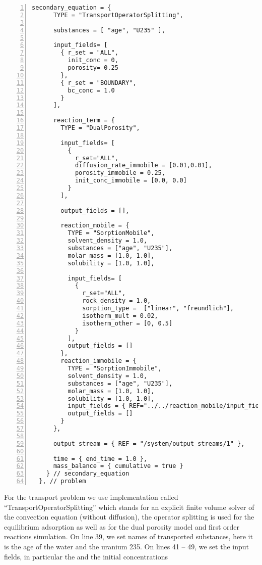 \documentclass[12pt,a4paper]{report}
\begin{document}
\begin{Verbatim}[numbers=left, firstnumber=last]
    secondary_equation = {
      TYPE = "TransportOperatorSplitting", 

      substances = [ "age", "U235" ],
      
      input_fields= [
        { r_set = "ALL",
          init_conc = 0,
          porosity= 0.25
        },
        { r_set = "BOUNDARY",
          bc_conc = 1.0
        }
      ],
      
      reaction_term = {
        TYPE = "DualPorosity",
        
        input_fields= [
          {
            r_set="ALL",
            diffusion_rate_immobile = [0.01,0.01],
            porosity_immobile = 0.25,
            init_conc_immobile = [0.0, 0.0]
          }
        ],
        
        output_fields = [],
        
        reaction_mobile = {
          TYPE = "SorptionMobile",
          solvent_density = 1.0,
          substances = ["age", "U235"],
          molar_mass = [1.0, 1.0],
          solubility = [1.0, 1.0],
          
          input_fields= [
            {
              r_set="ALL",
              rock_density = 1.0,
              sorption_type =  ["linear", "freundlich"],
              isotherm_mult = 0.02, 
              isotherm_other = [0, 0.5]
            }
          ],
          output_fields = []
        },
        reaction_immobile = {
          TYPE = "SorptionImmobile",
          solvent_density = 1.0,
          substances = ["age", "U235"],
          molar_mass = [1.0, 1.0],
          solubility = [1.0, 1.0],
          input_fields = { REF="../../reaction_mobile/input_fields" },
          output_fields = []
        }
      },
      
      output_stream = { REF = "/system/output_streams/1" },

      time = { end_time = 1.0 },
      mass_balance = { cumulative = true }
    } // secondary_equation
  }, // problem
\end{Verbatim}
For the transport problem we use implementation called ``TransportOperatorSplitting'' which stands for an explicit finite volume solver of the convection equation (without diffusion), 
the operator splitting is used for the equilibrium adsorption as well as for the dual porosity model and first order reactions simulation.
On line 39, we set names of transported substances, here it is the age of the water and the uranium 235. On lines 41 -- 49, we set the input fields, in particular the  and the initial concentrations 
\end{document}
